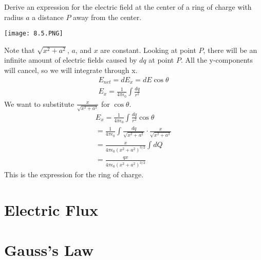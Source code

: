 \documentclass[../em.tex]{subfiles}
\begin{document}
\begin{example}
    Derive an expression for the electric field at the center of a ring of charge with radius $a$ a distance $P$ away from the center.
    \begin{center}
        \texttt{[image: 8.5.PNG]}
    \end{center}
    Note that $\sqrt{x^2+a^2}$, $a$, and $x$ are constant. 
    \smallbreak
    Looking at point $P$, there will be an infinite amount of electric fields caused by $dq$ at point $P$.
    \smallbreak
    All the y-components will cancel, so we will integrate through x.
    \begin{align*}
        E_{net}=dE_x=dE\cos\theta
        \\
        E_x=\frac{1}{4\pi\epsilon_0}\int\frac{dq}{r^2}
    \end{align*}
    We want to substitute $\frac{x}{\sqrt{x^2+a^2}}$ for $\cos\theta$.
    \begin{align*}
        E_x=\frac{1}{4\pi\epsilon_0}\int\frac{dq}{r^2}\cos\theta
        \\
        =\frac{1}{4\pi\epsilon_0}\int\frac{dq}{\sqrt{x^2+a^2}}\cdot\frac{x}{\sqrt{x^2+a^2}}
        \\
        =\frac{x}{4\pi\epsilon_0(x^2+a^2)^{3/2}}\int{dQ}
        \\
        =\frac{qx}{4\pi\epsilon_0(x^2+a^2)^{3/2}}
    \end{align*}
    This is the expression for the ring of charge. 
\end{example}

\section{Electric Flux}

\section{Gauss's Law}
\end{document}
